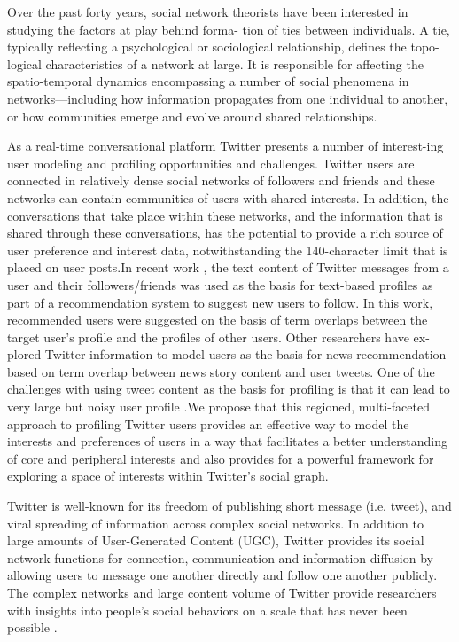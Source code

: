 \documentclass[twocolumn]{svjour3}          %
\begin{document}
Over the past forty years, social network theorists have
been interested in studying the factors at play behind forma- tion of ties between individuals. A tie, typically reflecting a psychological or sociological relationship, defines the topo- logical characteristics of a network at large. It is responsible for affecting the spatio-temporal dynamics encompassing a number of social phenomena in networks—including how information propagates from one individual to another, or how communities emerge and evolve around shared relationships.


As a real-time conversational platform Twitter presents a number of interest-ing user modeling and profiling opportunities and challenges. Twitter users are connected in relatively dense social networks of followers and friends and these networks can contain communities of users with shared interests. In addition, the conversations that take place within these networks, and the information
that is shared through these conversations, has the potential to provide a rich source of user preference and interest data, notwithstanding the 140-character limit that is placed on user posts.In recent work \cite{hannon2010recommending}, the text content of Twitter messages from a user and their followers/friends was used as the basis for text-based profiles as part of a recommendation system to suggest new users to follow. In this work, recommended users were suggested on the basis of term overlaps between the target user’s profile and the profiles of other users. Other researchers have ex- plored Twitter information to model users as the basis for news recommendation \cite{Abel:2011AUM,phelan2011terms} based on term overlap between news story content and user tweets.
One of the challenges with using tweet content as the basis for profiling is that it can lead to very large but noisy user profile \cite{liao2012mining}.We propose that this regioned, multi-faceted approach to profiling Twitter users provides an effective way to model the interests and preferences of users in a way that facilitates a better understanding of core and peripheral interests and also provides for a powerful framework for exploring a space of interests within Twitter’s social graph.

Twitter is well-known for its freedom of publishing short message (i.e. tweet), and viral spreading of information across complex social networks.
In addition to large amounts of User-Generated Content (UGC), Twitter provides its social network functions for connection, communication and information diffusion by allowing users to message one another directly and follow one another publicly. 
The complex networks and large content volume of Twitter provide researchers with insights into people’s social behaviors on a scale that has never been possible \cite{DBLP:conf/hicss/StieglitzD12}.
\end{document}
